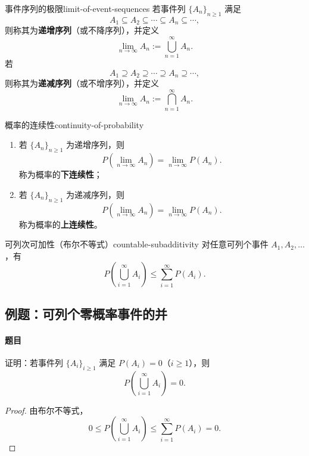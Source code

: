 \begin{mydefinition}{事件序列的极限}{limit-of-event-sequences}
若事件列 $\{A_n\}_{n\geq1}$ 满足
\[
A_1\subseteq A_2\subseteq\cdots\subseteq A_n\subseteq\cdots,
\]
则称其为\textbf{递增序列}（或不降序列），并定义
\[
\lim_{n\to\infty}A_n:=\bigcup_{n=1}^{\infty}A_n.
\]
若
\[
A_1\supseteq A_2\supseteq\cdots\supseteq A_n\supseteq\cdots,
\]
则称其为\textbf{递减序列}（或不增序列），并定义
\[
\lim_{n\to\infty}A_n:=\bigcap_{n=1}^{\infty}A_n.
\]
\end{mydefinition}

\begin{mytheorem}{概率的连续性}{continuity-of-probability}
\begin{enumerate}
\item 若 $\{A_n\}_{n\geq1}$ 为递增序列，则
\[
P\left(\lim_{n\to\infty}A_n\right)=\lim_{n\to\infty}P(A_n).
\]
称为概率的\textbf{下连续性}；
\item 若 $\{A_n\}_{n\geq1}$ 为递减序列，则
\[
P\left(\lim_{n\to\infty}A_n\right)=\lim_{n\to\infty}P(A_n).
\]
称为概率的\textbf{上连续性}。
\end{enumerate}
\end{mytheorem}

\begin{proposition}{可列次可加性（布尔不等式）}{countable-subadditivity}
对任意可列个事件 $A_1,A_2,\ldots$，有
\[
P\left(\bigcup_{i=1}^{\infty}A_i\right)
\leq\sum_{i=1}^{\infty}P(A_i).
\]
\end{proposition}

\subsection{例题：可列个零概率事件的并}\label{note:c1:e6}
\paragraph{题目}
证明：若事件列 $\{A_i\}_{i\geq1}$ 满足 $P(A_i)=0$（$i\geq1$），则
\[
P\left(\bigcup_{i=1}^{\infty}A_i\right)=0.
\]

\begin{proof}
由布尔不等式，
\[
0\leq P\left(\bigcup_{i=1}^{\infty}A_i\right)
\leq\sum_{i=1}^{\infty}P(A_i)=0.
\]
\end{proof}

